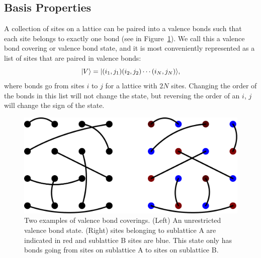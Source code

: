 \subsection{Basis Properties}
A collection of sites on a lattice can be paired into a valence bonds such that each site
belongs to exactly one bond (see in Figure~\ref{covering}).  
We call this a valence bond covering or valence bond state, and it is most conveniently represented as a list of 
sites that are paired in valence bonds:
\begin{equation}
	\lvert {V} \rangle = \lvert {(i_1,j_1)(i_2,j_2)\cdots(i_N,j_N)} \rangle,
\end{equation}
where bonds go from sites $i$ to $j$ for a lattice with $2N$ sites.  
Changing the order of the bonds in this list will not change the state, but reversing the order of an
$i$, $j$ will change the sign of the state.

\begin{figure} { \includegraphics [width=5.5in]
{./figures/made/coverings.pdf}
\centering
 \caption[Two valence bond coverings]{
	Two examples of valence bond coverings.  (Left) An unrestricted valence bond state.
	(Right) sites belonging to sublattice A are indicated in red and sublattice B sites are blue.   	 	This state only has bonds going from  sites on sublattice A to sites on sublattice B.  
 }
\label{covering}
}
\end{figure}
 
